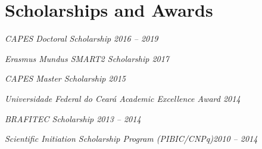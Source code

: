 \section{Scholarships and Awards}

{\sl CAPES Doctoral Scholarship \hfill 2016 -- 2019}

{\sl Erasmus Mundus SMART2 Scholarship \hfill 2017}

{\sl CAPES Master Scholarship \hfill 2015}

{\sl Universidade Federal do Cear\'a Academic Excellence Award \hfill 2014}

{\sl BRAFITEC Scholarship \hfill 2013 -- 2014}

{\sl Scientific Initiation Scholarship Program (PIBIC/CNPq)\hfill 2010 -- 2014}